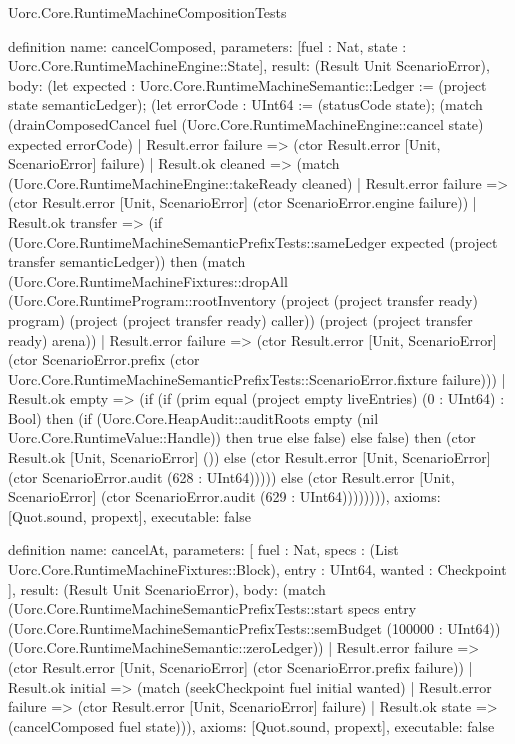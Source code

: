 \begin{lexlean}{Uorc.Core.RuntimeMachineCompositionTests}
\begin{semanticmodule}
definition{
  name: cancelComposed,
  parameters: [fuel : Nat, state : Uorc.Core.RuntimeMachineEngine::State],
  result: (Result Unit ScenarioError),
  body: (let expected : Uorc.Core.RuntimeMachineSemantic::Ledger := (project state semanticLedger); (let errorCode : UInt64 := (statusCode state); (match (drainComposedCancel fuel (Uorc.Core.RuntimeMachineEngine::cancel state) expected errorCode)
    | Result.error failure => (ctor Result.error [Unit, ScenarioError] failure)
    | Result.ok cleaned => (match (Uorc.Core.RuntimeMachineEngine::takeReady cleaned)
      | Result.error failure => (ctor Result.error [Unit, ScenarioError] (ctor ScenarioError.engine failure))
      | Result.ok transfer => (if (Uorc.Core.RuntimeMachineSemanticPrefixTests::sameLedger expected (project transfer semanticLedger)) then (match (Uorc.Core.RuntimeMachineFixtures::dropAll (Uorc.Core.RuntimeProgram::rootInventory (project (project transfer ready) program) (project (project transfer ready) caller)) (project (project transfer ready) arena))
        | Result.error failure => (ctor Result.error [Unit, ScenarioError] (ctor ScenarioError.prefix (ctor Uorc.Core.RuntimeMachineSemanticPrefixTests::ScenarioError.fixture failure)))
        | Result.ok empty => (if (if (prim equal (project empty liveEntries) (0 : UInt64) : Bool) then (if (Uorc.Core.HeapAudit::auditRoots empty (nil Uorc.Core.RuntimeValue::Handle)) then true else false) else false) then (ctor Result.ok [Unit, ScenarioError] ()) else (ctor Result.error [Unit, ScenarioError] (ctor ScenarioError.audit (628 : UInt64))))) else (ctor Result.error [Unit, ScenarioError] (ctor ScenarioError.audit (629 : UInt64)))))))),
  axioms: [Quot.sound, propext],
  executable: false
}

definition{
  name: cancelAt,
  parameters: [
    fuel : Nat,
    specs : (List Uorc.Core.RuntimeMachineFixtures::Block),
    entry : UInt64,
    wanted : Checkpoint
  ],
  result: (Result Unit ScenarioError),
  body: (match (Uorc.Core.RuntimeMachineSemanticPrefixTests::start specs entry (Uorc.Core.RuntimeMachineSemanticPrefixTests::semBudget (100000 : UInt64)) (Uorc.Core.RuntimeMachineSemantic::zeroLedger))
    | Result.error failure => (ctor Result.error [Unit, ScenarioError] (ctor ScenarioError.prefix failure))
    | Result.ok initial => (match (seekCheckpoint fuel initial wanted)
      | Result.error failure => (ctor Result.error [Unit, ScenarioError] failure)
      | Result.ok state => (cancelComposed fuel state))),
  axioms: [Quot.sound, propext],
  executable: false
}


\end{semanticmodule}
\end{lexlean}
